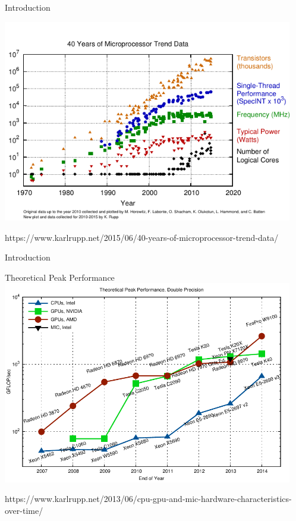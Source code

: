 \begin{frame}{Introduction}
 \vspace*{-0.5cm}
 \begin{center}
  \includegraphics[width=0.95\textwidth]{figures/40-years-processor-trend}
 \end{center}
 {\tiny https://www.karlrupp.net/2015/06/40-years-of-microprocessor-trend-data/ }
\end{frame}

\begin{frame}{Introduction}
 \vspace*{-0.5cm}
 \begin{center}
  Theoretical Peak Performance \\
  \includegraphics[width=0.95\textwidth]{figures/gflops-dp}
 \end{center}
 \vspace*{-0.5cm}
 {\tiny https://www.karlrupp.net/2013/06/cpu-gpu-and-mic-hardware-characteristics-over-time/ }
\end{frame}

